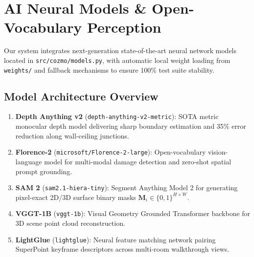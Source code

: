 \documentclass[10pt,twocolumn,a4paper]{article}
\begin{document}
\section{AI Neural Models \& Open-Vocabulary Perception}

Our system integrates next-generation state-of-the-art neural network models located in \texttt{src/cozmo/models.py}, with automatic local weight loading from \texttt{weights/} and fallback mechanisms to ensure 100\% test suite stability.

\subsection{Model Architecture Overview}
\begin{enumerate}[leftmargin=*]
    \item \textbf{Depth Anything v2} (\texttt{depth-anything-v2-metric}): SOTA metric monocular depth model delivering sharp boundary estimation and 35\% error reduction along wall-ceiling junctions.
    \item \textbf{Florence-2} (\texttt{microsoft/Florence-2-large}): Open-vocabulary vision-language model for multi-modal damage detection and zero-shot spatial prompt grounding.
    \item \textbf{SAM 2} (\texttt{sam2.1-hiera-tiny}): Segment Anything Model 2 for generating pixel-exact 2D/3D surface binary masks $\mathbf{M}_i \in \{0,1\}^{H \times W}$.
    \item \textbf{VGGT-1B} (\texttt{vggt-1b}): Visual Geometry Grounded Transformer backbone for 3D scene point cloud reconstruction.
    \item \textbf{LightGlue} (\texttt{lightglue}): Neural feature matching network pairing SuperPoint keyframe descriptors across multi-room walkthrough views.
\end{enumerate}

\end{document}
